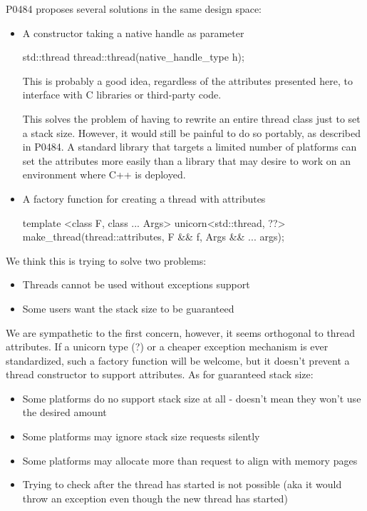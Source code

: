 \documentclass{wg21}
\begin{document}
P0484 proposes several solutions in the same design space:

\begin{itemize}
\item  A constructor taking a native handle as parameter
\begin{codeblock}
std::thread thread::thread(native_handle_type h);
\end{codeblock}

This is probably a good idea, regardless of the attributes presented here, 
to interface with C libraries or third-party code.

This solves the problem of having to rewrite an entire thread class just to set a stack size.
However, it would still be painful to do so portably, as described in P0484.
A standard library that targets a limited number of platforms can set the attributes more easily than a library that may desire to work on an environment where C++ is deployed. 

\item A factory function for creating a thread with attributes
\begin{codeblock}
template <class F, class ... Args>
unicorn<std::thread, ??> make_thread(thread::attributes, F && f, Args && ... args);
\end{codeblock}
\end{itemize}

We think this is trying to solve two problems:

\begin{itemize}
\item  Threads cannot be used without exceptions support
\item  Some users want the stack size to be guaranteed
\end{itemize}

We are sympathetic to the first concern, however, it seems orthogonal to thread attributes.
If a unicorn type (?) or a cheaper exception mechanism is ever standardized, 
such a factory function will be welcome, but it doesn't prevent a thread constructor to support attributes.
As for guaranteed stack size:

\begin{itemize}
\item  Some platforms do no support stack size at all - doesn't mean they won't use the desired amount
\item  Some platforms may ignore stack size requests silently
\item  Some platforms may allocate more than request to align with memory pages
\item  Trying to check after the thread has started is not possible (aka it would throw an exception even though the new thread has started) 
\end{itemize}
\end{document}
